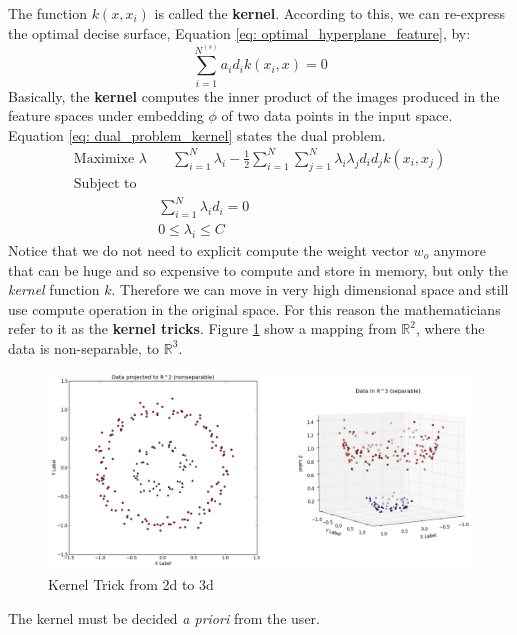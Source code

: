 \documentclass[11pt]{article}
\begin{document}
The function $k(x, x_i)$ is called the \textbf{kernel}. According to this, we can re-express the optimal decise surface, Equation \ref{eq: optimal_hyperplane_feature}, by:
\begin{equation}
\sum^{N^{(s)}}_{i = 1}a_id_ik(x_i,x) = 0
\label{eq: optimal_hyperplane_feature_kernel}
\end{equation} 
Basically, the \textbf{kernel} computes the inner product of the images produced in the feature spaces under embedding $\phi$ of two data points in the input space. Equation \ref{eq: dual_problem_kernel} states the dual problem.
\begin{equation}
    \label{eq: dual_problem_kernel}
    \begin{aligned}
    \text{Maximixe } \lambda & \quad \sum^N_{i=1} \lambda_i - \frac{1}{2} \sum_{i=1}^N \sum_{j=1}^N \lambda_i \lambda_j d_i d_j k(x_i,x_j) \\
     \text{Subject to} & \\
           & \sum^N_{i=1} \lambda_i d_i = 0\quad \\
           & 0 \le \lambda_i \le C 
         \end{aligned}
    \end{equation}
Notice that we do not need to explicit compute the weight vector $w_o$ anymore that can be huge and so expensive to compute and store in memory, but only the \emph{kernel} function $k$. Therefore we can move in very high dimensional space and still use compute operation in the original space. For this reason the mathematicians refer to it as the \textbf{kernel tricks}. Figure \ref{fig: kernel_trick} show a mapping from $\mathbb{R}^2$, where the data is non-separable, to $\mathbb{R}^3$. 
\begin{figure}[H]
\centering
\includegraphics[scale=0.3]{images/kernel_trick_2d_3d}
\caption{Kernel Trick from 2d to 3d}
\label{fig: kernel_trick}
\end{figure}
The kernel must be decided \emph{a priori} from the user.
\end{document}

